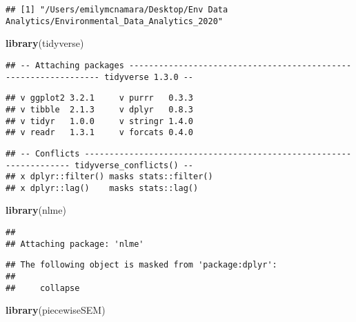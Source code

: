 \documentclass[]{article}
\newenvironment{Shaded}{\begin{snugshade}}{\end{snugshade}}
\newcommand{\KeywordTok}[1]{\textcolor[rgb]{0.13,0.29,0.53}{\textbf{#1}}}
\newcommand{\CommentTok}[1]{\textcolor[rgb]{0.56,0.35,0.01}{\textit{#1}}}
\newcommand{\NormalTok}[1]{#1}
\begin{document}
\begin{Shaded}
\end{Shaded}

\begin{verbatim}
## [1] "/Users/emilymcnamara/Desktop/Env Data Analytics/Environmental_Data_Analytics_2020"
\end{verbatim}

\begin{Shaded}
\begin{Highlighting}[]
\KeywordTok{library}\NormalTok{(tidyverse)}
\end{Highlighting}
\end{Shaded}

\begin{verbatim}
## -- Attaching packages ---------------------------------------------------------------- tidyverse 1.3.0 --
\end{verbatim}

\begin{verbatim}
## v ggplot2 3.2.1     v purrr   0.3.3
## v tibble  2.1.3     v dplyr   0.8.3
## v tidyr   1.0.0     v stringr 1.4.0
## v readr   1.3.1     v forcats 0.4.0
\end{verbatim}

\begin{verbatim}
## -- Conflicts ------------------------------------------------------------------- tidyverse_conflicts() --
## x dplyr::filter() masks stats::filter()
## x dplyr::lag()    masks stats::lag()
\end{verbatim}

\begin{Shaded}
\begin{Highlighting}[]
\KeywordTok{library}\NormalTok{(nlme)}
\end{Highlighting}
\end{Shaded}

\begin{verbatim}
## 
## Attaching package: 'nlme'
\end{verbatim}

\begin{verbatim}
## The following object is masked from 'package:dplyr':
## 
##     collapse
\end{verbatim}

\begin{Shaded}
\begin{Highlighting}[]
\KeywordTok{library}\NormalTok{(piecewiseSEM)}
\end{Highlighting}
\end{Shaded}
\end{document}
